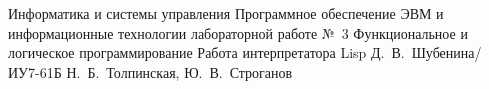 \documentclass{bmstu}
\begin{document}
	\makereporttitle
	{Информатика и системы управления} %
	{Программное обеспечение ЭВМ и информационные технологии} %
	{лабораторной работе №~3} %
	{Функциональное и логическое программирование} %
	{Работа интерпретатора Lisp} %
	{} %
	{Д.~В.~Шубенина/ИУ7-61Б} %
	{Н.~Б.~Толпинская, Ю.~В.~Строганов} %
	\maketableofcontents
	
\end{document}

